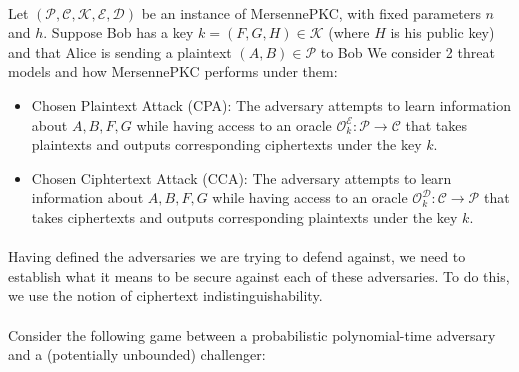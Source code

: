 \paragraph{}
Let $(\mathcal{P}, \mathcal{C}, \mathcal{K}, \mathcal{E}, \mathcal{D})$ be an instance of MersennePKC, with fixed parameters $n$ and $h$. Suppose Bob has a key $k = (F, G, H) \in \mathcal{K}$ (where $H$ is his public key) and that Alice is sending a plaintext $(A, B) \in \mathcal{P}$ to Bob We consider 2 threat models and how MersennePKC performs under them:
\begin{itemize}
    \item Chosen Plaintext Attack (CPA): The adversary attempts to learn information about $A, B, F, G$ while having access to an oracle $\mathcal{O}_k^\mathcal{E}: \mathcal{P} \rightarrow \mathcal{C}$ that takes plaintexts and outputs corresponding ciphertexts under the key $k$.
    \item Chosen Ciphtertext Attack (CCA): The adversary attempts to learn information about $A, B, F, G$ while having access to an oracle $\mathcal{O}_k^\mathcal{D}: \mathcal{C} \rightarrow \mathcal{P}$ that takes ciphertexts and outputs corresponding plaintexts under the key $k$.
\end{itemize}

\paragraph{}
Having defined the adversaries we are trying to defend against, we need to establish what it means to be secure against each of these adversaries. To do this, we use the notion of ciphertext indistinguishability.

\paragraph{}
Consider the following game between a probabilistic polynomial-time adversary and a (potentially unbounded) challenger:


